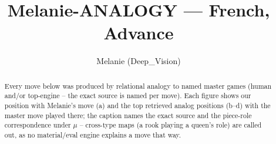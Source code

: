 \documentclass[11pt]{article}
\title{Melanie-ANALOGY — French, Advance}
\author{Melanie (Deep\_Vision)}
\date{}
\begin{document}
\maketitle

\begin{abstract}Every move below was produced by relational analogy to named master games (human and/or top-engine -- the exact source is named per move). Each figure shows our position with Melanie's move (a) and the top retrieved analog positions (b--d) with the master move played there; the caption names the exact source and the piece-role correspondence under $\mu$ -- cross-type maps (a rook playing a queen's role) are called out, as no material/eval engine explains a move that way.\end{abstract}

\begin{figure}[p]\centering
\begin{subfigure}{0.46\textwidth}\centering
\resizebox{\linewidth}{!}{%
\newchessgame
\chessboard[
  setfen={r3kbnr/pp1b1ppp/1qn1p3/2ppP3/3P3P/P1P2N2/1P3PP1/RNBQKB1R b KQkq - 0 7},
  showmover=false,
  pgfstyle=straightmove, color=movearrow, markmove={d7-c8}
]}
\caption{}
\end{subfigure}\hfill
\begin{subfigure}{0.46\textwidth}\centering
\resizebox{\linewidth}{!}{%
\newchessgame
\chessboard[
  setfen={r1b1kbnr/pp3ppp/1qn1p3/2ppP3/3P4/P1P2N2/1P3PPP/RNBQKB1R b KQkq - 0 6},
  showmover=false,
  pgfstyle=straightmove, color=movearrow, markmove={g8-h6}
]}
\caption{}
\end{subfigure}
\\[4pt]
\begin{subfigure}{0.46\textwidth}\centering
\resizebox{\linewidth}{!}{%
\newchessgame
\chessboard[
  setfen={r1b1kbnr/pp3ppp/1qn1p3/2ppP3/3P4/P1P2N2/1P3PPP/RNBQKB1R b KQkq - 0 6},
  showmover=false,
  pgfstyle=straightmove, color=movearrow, markmove={g8-h6}
]}
\caption{}
\end{subfigure}\hfill
\begin{subfigure}{0.46\textwidth}\centering
\resizebox{\linewidth}{!}{%
\newchessgame
\chessboard[
  setfen={r1b1kbnr/pp3ppp/1qn1p3/2ppP3/3P4/P1P2N2/1P3PPP/RNBQKB1R b KQkq - 0 6},
  showmover=false,
  pgfstyle=straightmove, color=movearrow, markmove={g8-h6}
]}
\caption{}
\end{subfigure}

\end{figure}
\end{document}
